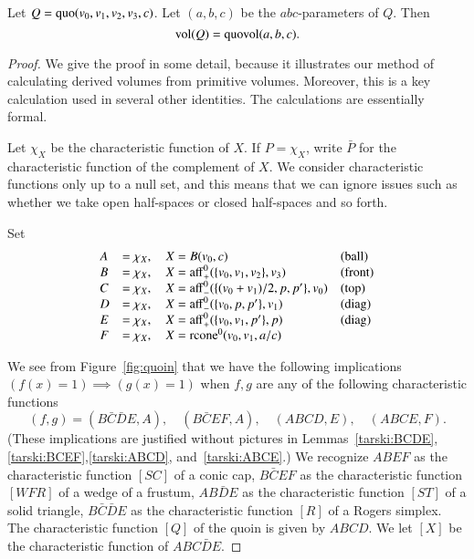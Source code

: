 \begin{lemma}
Let $Q={\operatorname{quo}}(v_0,v_1,v_2,v_3,c)$. Let $(a,b,c)$ be the
$abc$-parameters of $Q$.  
Then $${\operatorname{vol}}(Q) = {\operatorname{quovol}}(a,b,c).$$
%
\end{lemma}

\begin{proof} We give the proof in some detail, because it illustrates
our method of calculating derived volumes from primitive volumes.  Moreover,
this is a key calculation used in several other identities.
The calculations are essentially formal.

Let $\chi_X$ be the characteristic
function of $X$.  If $P = \chi_X$, write $\bar P$ for the characteristic
function of the complement of $X$.  We consider characteristic functions
only up to a null set, and this means that we can ignore issues such
as whether we take open half-spaces or closed half-spaces and so forth.

Set
$$
\begin{array}{llll}
  A &= \chi_X,\quad X = B(v_0,c)&\text{(ball)}\\
  B &= \chi_X,\quad X = {\operatorname{aff}}_+^0(\{v_0,v_1,v_2\},v_3)&\text{(front)}\\
  C &= \chi_X,\quad X = {\operatorname{aff}}_-^0(\{(v_0+v_1)/2,p,p'\},v_0)
    &\text{(top)}\\
  D &= \chi_X,\quad X = {\operatorname{aff}}_-^0(\{v_0,p,p'\},v_1)&\text{(diag)}\\
  E &= \chi_X,\quad X = {\operatorname{aff}}_+^0(\{v_0,v_1,p'\},p)&\text{(diag)}\\
  F &= \chi_X,\quad X = {\operatorname{rcone}}^0(v_0,v_1,a/c)\\
\end{array}
$$

We see from Figure~\ref{fig:quoin} that we have the following implications
$(f(x)=1)\implies (g(x)=1)$ when $f,g$ are any of the following characteristic
functions
  $$
   (f,g) = (B\bar C \bar D E,A),\quad
   (B\bar C E F,A),\quad (A B C D, E),\quad (A B C E,F).
  $$
(These implications are justified without pictures in Lemmas~\ref{tarski:BCDE},\ref{tarski:BCEF},\ref{tarski:ABCD}, and~\ref{tarski:ABCE}.)
We recognize $ABEF$ as the characteristic function $[SC]$ of a
conic cap, $B\bar C E F$ as the characteristic function $[WFR]$ of a
wedge of a frustum,  $AB\bar D E$ as the characteristic function $[ST]$
of a solid triangle, $B\bar C\bar D E$ as the characteristic function $[R]$
of a Rogers simplex.  The characteristic function $[Q]$
of the quoin is given
by $A B C D$.  We let $[X]$ be the characteristic function of
$A B C \bar D E$.


\end{proof}
